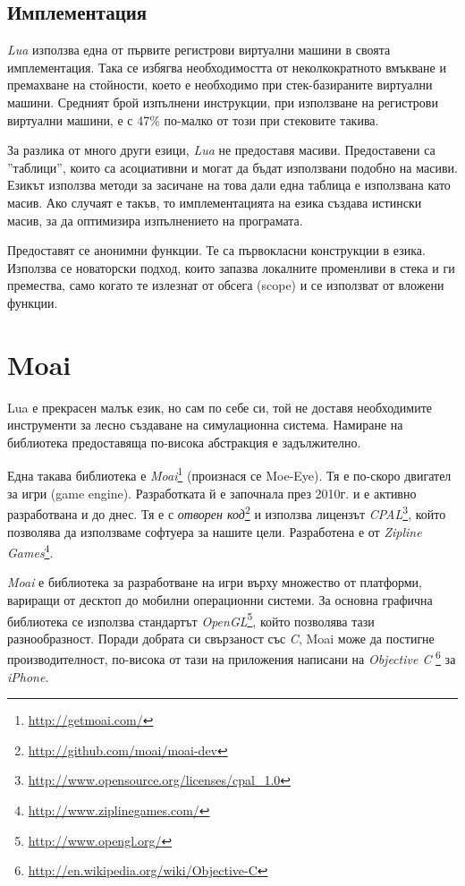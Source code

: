 		\subsection{Имплементация}
		
			\emph{Lua} използва една от първите регистрови виртуални машини в своята имплементация. Така се избягва
			необходимостта от неколкократното вмъкване и премахване на стойности, 
			което е необходимо при стек-базираните виртуални машини. Средният брой изпълнени инструкции, при използване
			на регистрови виртуални машини, е с 47\% по-малко от този при стековите такива. \cite{Khan}
			
			За разлика от много други езици, \emph{Lua} не предоставя масиви. Предоставени са ''таблици'', които
			са асоциативни и могат да бъдат използвани подобно на масиви. Езикът използва методи за
			засичане на това дали една таблица е използвана като масив. Ако случаят е такъв, то имплементацията
			на езика създава истински масив, за да оптимизира изпълнението на програмата.
			
			Предоставят се анонимни функции. Те са първокласни конструкции в езика. Използва се новаторски подход,
			които запазва локалните променливи в стека и ги премества, само когато те излезнат от обсега (scope) и
			се използват от вложени функции.
	
	\section{Moai}
	
		Lua е прекрасен малък език, но сам по себе си, той не доставя необходимите инструменти
		за лесно създаване на симулационна система. Намиране на библиотека предоставяща по-висока
		абстракция е задължително.
		
		Една такава библиотека е \emph{Moai}\footnote{\url{http://getmoai.com/}} (произнася се Moe-Eye).
		Тя е по-скоро двигател за игри (game engine).
		Разработката й е започнала през 2010г. и е активно разработвана и до днес. 
		Тя е с \emph{отворен код}\footnote{\url{http://github.com/moai/moai-dev}}
		и използва лицензът \emph{CPAL}\footnote{\url{http://www.opensource.org/licenses/cpal_1.0}}, който
		позволява да използваме софтуера за нашите цели. 
		Разработена е от \emph{Zipline Games}\footnote{\url{http://www.ziplinegames.com/}}.						
		
		\emph{Moai} е библиотека за разработване на игри върху множество от платформи, вариращи от десктоп до
		мобилни операционни системи. За основна графична библиотека се използва стандартът 
		\emph{OpenGL}\footnote{\url{http://www.opengl.org/}}, който позволява тази разнообразност.
		Поради добрата си свързаност със \emph{C}, Moai може да постигне производителност, по-висока
		от тази на приложения написани на  \emph{Objective C}
		\footnote{\url{http://en.wikipedia.org/wiki/Objective-C}} за \emph{iPhone}.
		

